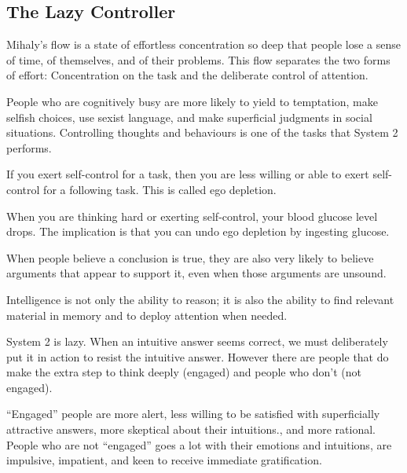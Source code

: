 \subsection*{The Lazy Controller}
\bit
\item Mihaly's flow is a state of effortless concentration so deep that people lose a sense of time, of themselves,
and of their problems. This flow separates the two forms of effort: Concentration on the task and the deliberate
control of attention.
\item People who are cognitively busy are more likely to yield to temptation, make selfish choices, use sexist
language, and make superficial judgments in social situations. Controlling thoughts and behaviours is one of the
tasks that System 2 performs.
\item If you exert self-control for a task, then you are less willing or able to exert self-control for a following
task. This is called ego depletion.
\item When you are thinking hard or exerting self-control, your blood glucose level drops. The implication is that
you can undo ego depletion by ingesting glucose.
\item When people believe a conclusion is true, they are also very likely to believe arguments that appear to support
it, even when those arguments are unsound.
\item Intelligence is not only the ability to reason; it is also the ability to find relevant material in memory and
to deploy attention when needed.
\item System 2 is lazy. When an intuitive answer seems correct, we must deliberately put it in action to resist the
intuitive answer. However there are people that do make the extra step to think deeply (engaged) and people who don’t
(not engaged).
\item ``Engaged'' people are more alert, less willing to be satisfied with superficially attractive answers, more
skeptical about their intuitions., and more rational. People who are not ``engaged'' goes a lot with their emotions and
intuitions, are impulsive, impatient, and keen to receive immediate gratification.
\eit

